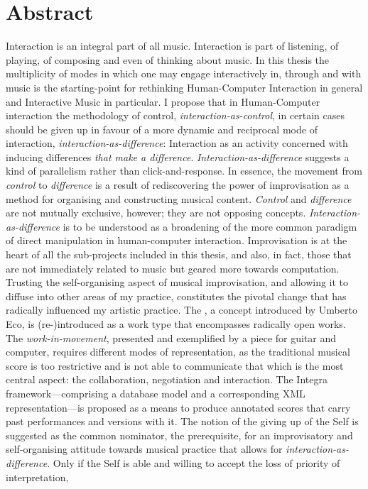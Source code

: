 
\chapter*{Abstract}
\label{cha:abstract}
\setcounter{page}{1}
\pagestyle{plain}

Interaction is an integral part of all music. Interaction is part of listening, of playing, of composing and even of thinking about music. In this thesis the multiplicity of modes in which one may engage interactively in, through and with music is the starting-point for rethinking Human-Computer Interaction in general and Interactive Music in particular. I propose that in Human-Computer interaction the methodology of control, \emph{interaction-as-control}, in certain cases should be given up in favour of a more dynamic and reciprocal mode of interaction, \emph{interaction-as-difference}: Interaction as an activity concerned with inducing differences \emph{that make a difference}. \emph{Interaction-as-difference} suggests a kind of parallelism rather than click-and-response. In essence, the movement from \emph{control} to \emph{difference} is a result of rediscovering the power of improvisation as a method for organising and constructing musical content. \emph{Control} and \emph{difference} are not mutually exclusive, however; they are not opposing concepts. \emph{Interaction-as-difference} is to be understood as a broadening of the more common paradigm of direct manipulation in human-computer interaction. Improvisation is at the heart of all the sub-projects included in this thesis, and also, in fact, those that are not immediately related to music but geared more towards computation. Trusting the self-organising aspect of musical improvisation, and allowing it to diffuse into other areas of my practice, constitutes the pivotal change that has radically influenced my artistic practice. The , a concept introduced by Umberto Eco, is (re-)introduced as a work type that encompasses radically open works. The \emph{work-in-movement}, presented and exemplified by a piece for guitar and computer, requires different modes of representation, as the traditional musical score is too restrictive and is not able to communicate that which is the most central aspect: the collaboration, negotiation and interaction. The Integra framework---comprising a database model and a corresponding XML representation---is proposed as a means to produce annotated scores that carry past performances and versions with it. The notion of the giving up of the Self is suggested as the common nominator, the prerequisite, for an improvisatory and self-organising attitude towards musical practice that allows for \emph{interaction-as-difference}. Only if the Self is able and willing to accept the loss of priority of interpretation, 